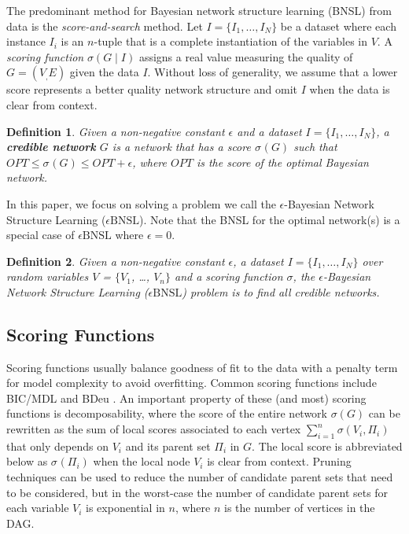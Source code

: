 \documentclass[letterpaper]{article}
\newcommand{\opt}{\mathit{OPT}}
\newcommand{\graph}{\mathit{G}}
\newcommand{\vertex}[1]{V_{#1}}
\newcommand{\vertices}{\mathit{V}}
\newcommand{\edges}{\mathit{E}}
\newcommand{\parents}{\Pi}
\newcommand{\problem}{\mathit{\epsilon}\text{BNSL}}
\newcommand{\score}[2]{\sigma_{#1}({#2})}
\newtheorem{definition}{Definition}
\begin{document}
The predominant method for Bayesian network structure learning (BNSL) from data is
the \emph{score-and-search} method.
Let
$I =
\{I_1, \ldots, I_N\}$ be a dataset where each instance $I_i$ is an $n$-tuple that is a
complete instantiation of the variables in $\vertices$. A \emph{scoring
function} $\sigma( \graph \mid I )$ assigns a real value measuring
the quality of $\graph=(\vertex,\edges)$ given the data $I$.
Without loss of generality, we assume that a lower score
represents a better quality network structure and omit $I$ when the data is clear from context.

\begin{definition}
Given a non-negative constant $\epsilon$ and a dataset $I = \{I_1, \ldots, I_N\}$, a \textbf{credible  network} $G$ is a network that has a score $\score{}{\graph}$ such that $\opt \leq \score{}{\graph} \leq \opt + \epsilon$, where $\opt$ is the score of the optimal Bayesian network.
\end{definition}

In this paper, we focus on solving a problem we call the $\epsilon$-Bayesian Network Structure Learning ($\problem$). Note that the BNSL for the optimal network(s) is a special case of $\problem$ where $\epsilon=0$.
\begin{definition}
Given a non-negative constant $\epsilon$, a dataset $I = \{I_1, \ldots, I_N\}$
over random variables $\vertices$ = $\{V_{1}$, \ldots, $V_{n}\}$ and a scoring
function $\sigma$, the $\epsilon$-Bayesian Network Structure Learning ($\problem$)
problem is to find all credible networks.
\end{definition}


\subsection{Scoring Functions}

Scoring functions usually balance goodness of fit to
the data with a penalty term for model complexity
to avoid overfitting. Common scoring functions
include BIC/MDL \cite{LamB94,Schwarz78} and BDeu
\cite{Buntine91,HeckermanGC95}. An important property of these
(and most) scoring functions is decomposability,
where the score of the entire network
$\sigma( \graph )$
can be rewritten as the sum of local scores associated to each vertex
$\sum_{i = 1}^{n} \sigma(\vertex{i},\parents_i )$
that only depends on $\vertex{i}$ and its parent set $\parents_{i}$ in
$\graph$. The local score is abbreviated below as $\score{}{\parents_i}$  when the local node $\vertex{i}$ is clear from context.
Pruning techniques can be used to reduce the
number of candidate parent sets that need to be considered,
but in the worst-case the number of candidate parent sets
for each variable $\vertex{i}$ is exponential in $n$, where $n$
is the number of vertices in the DAG.
\end{document}

